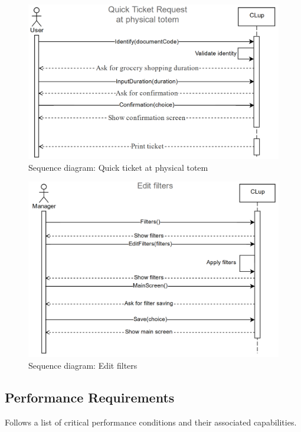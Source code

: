 \begin{figure}[H]
	\includegraphics[width=\linewidth]{../Diagrams/Totem.png}
	\caption{Sequence diagram: Quick ticket at physical totem}
	\label{fig:Totem}
\end{figure} 

\begin{figure}[H]
	\includegraphics[width=\linewidth]{../Diagrams/EditFilters.png}
	\caption{Sequence diagram: Edit filters}
	\label{fig:EditFilt}
\end{figure}

\newpage
\subsection{Performance Requirements \label{subs:performance}}
Follows a list of critical performance conditions and their associated capabilities. \newline

